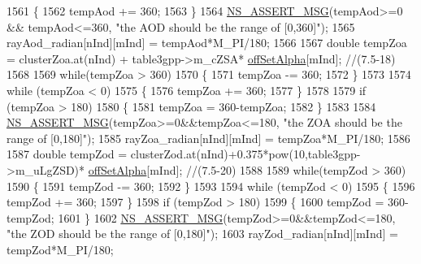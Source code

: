 \begin{DoxyCode}
1561                         \{
1562                                 tempAod += 360;
1563                         \}
1564                         \hyperlink{assert_8h_aff5ece9066c74e681e74999856f08539}{NS\_ASSERT\_MSG}(tempAod>=0 && tempAod<=360, \textcolor{stringliteral}{"the AOD should be the range
       of [0,360]"});
1565                         rayAod\_radian[nInd][mInd] = tempAod*M\_PI/180;
1566 
1567                         \textcolor{keywordtype}{double} tempZoa = clusterZoa.at(nInd) + table3gpp->m\_cZSA*
      \hyperlink{namespacens3_a2344173eeb094a196c555a159e87bc6f}{offSetAlpha}[mInd]; \textcolor{comment}{//(7.5-18)}
1568 
1569                         \textcolor{keywordflow}{while}(tempZoa > 360)
1570                         \{
1571                                 tempZoa -= 360;
1572                         \}
1573 
1574                         \textcolor{keywordflow}{while} (tempZoa < 0)
1575                         \{
1576                                 tempZoa += 360;
1577                         \}
1578 
1579                         \textcolor{keywordflow}{if} (tempZoa > 180)
1580                         \{
1581                                 tempZoa = 360-tempZoa;
1582                         \}
1583 
1584                         \hyperlink{assert_8h_aff5ece9066c74e681e74999856f08539}{NS\_ASSERT\_MSG}(tempZoa>=0&&tempZoa<=180, \textcolor{stringliteral}{"the ZOA should be the range
       of [0,180]"});
1585                         rayZoa\_radian[nInd][mInd] = tempZoa*M\_PI/180;
1586 
1587                         \textcolor{keywordtype}{double} tempZod = clusterZod.at(nInd)+0.375*pow(10,table3gpp->m\_uLgZSD)*
      \hyperlink{namespacens3_a2344173eeb094a196c555a159e87bc6f}{offSetAlpha}[mInd]; \textcolor{comment}{//(7.5-20)}
1588 
1589                         \textcolor{keywordflow}{while}(tempZod > 360)
1590                         \{
1591                                 tempZod -= 360;
1592                         \}
1593 
1594                         \textcolor{keywordflow}{while} (tempZod < 0)
1595                         \{
1596                                 tempZod += 360;
1597                         \}
1598                         \textcolor{keywordflow}{if} (tempZod > 180)
1599                         \{
1600                                 tempZod = 360-tempZod;
1601                         \}
1602                         \hyperlink{assert_8h_aff5ece9066c74e681e74999856f08539}{NS\_ASSERT\_MSG}(tempZod>=0&&tempZod<=180, \textcolor{stringliteral}{"the ZOD should be the range
       of [0,180]"});
1603                         rayZod\_radian[nInd][mInd] = tempZod*M\_PI/180;

\end{DoxyCode}
